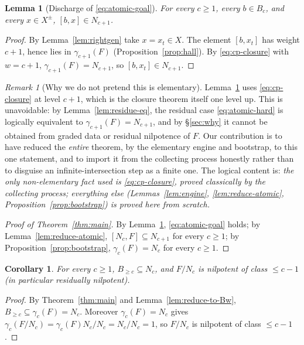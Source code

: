 \documentclass{amsart}
\newtheorem{lemma}{Lemma}
\newtheorem{corollary}{Corollary}
\theoremstyle{definition}
\theoremstyle{remark}
\newtheorem{remark}{Remark}
\begin{document}
\begin{lemma}[Discharge of \eqref{eq:atomic-goal}]\label{lem:hardcase}
For every $c\ge1$, every $b\in B_c$, and every $x\in X^{\pm}$, $[b,x]\in N_{c+1}$.
\end{lemma}

\begin{proof}
By Lemma~\ref{lem:rightgen} take $x=x_t\in X$. The element $[b,x_t]$ has weight
$c+1$, hence lies in $\gamma_{c+1}(F)$ (Proposition~\ref{prop:hall}). By
\eqref{eq:cp-closure} with $w=c+1$, $\gamma_{c+1}(F)=N_{c+1}$, so $[b,x_t]\in
N_{c+1}$.
\end{proof}

\begin{remark}[Why we do not pretend this is elementary]
Lemma~\ref{lem:hardcase} uses \eqref{eq:cp-closure} at level $c+1$, which is the
closure theorem itself one level up. This is unavoidable: by
Lemma~\ref{lem:residue-eq}, the residual case \eqref{eq:atomic-hard} is logically
equivalent to $\gamma_{c+1}(F)=N_{c+1}$, and by \S\ref{sec:why} it cannot be
obtained from graded data or residual nilpotence of $F$. Our contribution is to
have reduced the \emph{entire} theorem, by the elementary engine and bootstrap, to
this one statement, and to import it from the collecting process honestly rather
than to disguise an infinite-intersection step as a finite one. The logical
content is: \emph{the only non-elementary fact used is \eqref{eq:cp-closure},
proved classically by the collecting process; everything else
(Lemmas~\ref{lem:engine}, \ref{lem:reduce-atomic},
Proposition~\ref{prop:bootstrap}) is proved here from scratch.}
\end{remark}

\begin{proof}[Proof of Theorem~\ref{thm:main}]
By Lemma~\ref{lem:hardcase}, \eqref{eq:atomic-goal} holds; by
Lemma~\ref{lem:reduce-atomic}, $[N_c,F]\subseteq N_{c+1}$ for every $c\ge1$; by
Proposition~\ref{prop:bootstrap}, $\gamma_c(F)=N_c$ for every $c\ge1$.
\end{proof}

\begin{corollary}
For every $c\ge1$, $B_{\ge c}\subseteq N_c$, and $F/N_c$ is nilpotent of class
$\le c-1$ (in particular residually nilpotent).
\end{corollary}

\begin{proof}
By Theorem~\ref{thm:main} and Lemma~\ref{lem:reduce-to-Bw}, $B_{\ge c}\subseteq
\gamma_c(F)=N_c$. Moreover $\gamma_c(F)=N_c$ gives
$\gamma_c(F/N_c)=\gamma_c(F)N_c/N_c=N_c/N_c=1$, so $F/N_c$ is nilpotent of class
$\le c-1$.
\end{proof}
\end{document}
